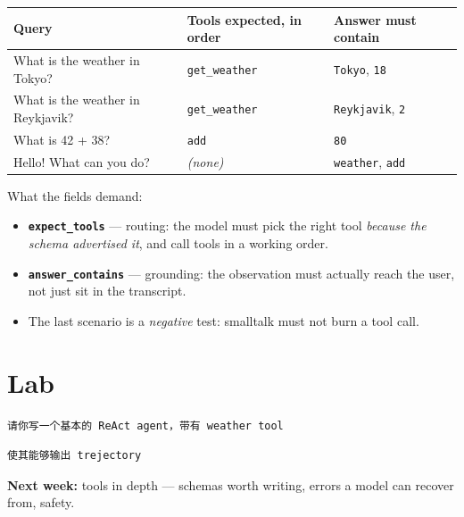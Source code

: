 \documentclass[12pt]{ctexart}
\begin{document}
\begin{center}
\small
\begin{tabularx}{0.98\textwidth}{@{}>{\raggedright\arraybackslash}X ll@{}}
  \toprule
  \textbf{Query} & \textbf{Tools expected, in order} & \textbf{Answer must contain} \\
  \midrule
  What is the weather in Tokyo?     & \texttt{get\_weather} & \texttt{Tokyo}, \texttt{18} \\
  What is the weather in Reykjavik? & \texttt{get\_weather} & \texttt{Reykjavik}, \texttt{2} \\
  What is 42 + 38?                  & \texttt{add}          & \texttt{80} \\
  Hello! What can you do?           & \emph{(none)}         & \texttt{weather}, \texttt{add} \\
  \bottomrule
\end{tabularx}
\end{center}

\noindent What the fields demand:
\begin{itemize}
  \item \textbf{\texttt{expect\_tools}} --- routing: the model must pick the
    right tool \emph{because the schema advertised it}, and call tools in a
    working order.
  \item \textbf{\texttt{answer\_contains}} --- grounding: the observation must
    actually reach the user, not just sit in the transcript.
  \item The last scenario is a \emph{negative} test: smalltalk must not burn a
    tool call.
\end{itemize}

\section{Lab}

\begin{verbatim}
请你写一个基本的 ReAct agent，带有 weather tool
\end{verbatim}

\begin{verbatim}
使其能够输出 trejectory
\end{verbatim}

\noindent\textbf{Next week:} tools in depth --- schemas worth writing, errors a model can recover from, safety.
\end{document}
